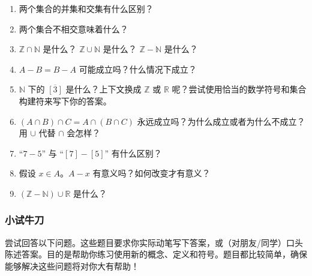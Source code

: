 \begin{enumerate}[label=(\arabic*)]
    \item 两个集合的并集和交集有什么区别？
    \item 两个集合不相交意味着什么？
    \item $\mathbb{Z} \cap \mathbb{N}$ 是什么？ $\mathbb{Z} \cup \mathbb{N}$ 是什么？ $\mathbb{Z}-\mathbb{N}$ 是什么？
    \item $A - B = B - A$ 可能成立吗？什么情况下成立？
    \item $\mathbb{N}$ 下的 $\overline{[3]}$ 是什么？上下文换成 $\mathbb{Z}$ 或 $\mathbb{R}$ 呢？尝试使用恰当的数学符号和集合构建符来写下你的答案。
    \item $(A \cap B) \cap C = A \cap (B \cap C)$ 永远成立吗？为什么成立或者为什么不成立？ 用 $\cup$ 代替 $\cap$ 会怎样？
    \item ``$7-5$'' 与 ``$[7]-[5]$'' 有什么区别？
    \item 假设 $x \in A$。$A - x$ 有意义吗？如何改变才有意义？
    \item $(\mathbb{Z} - \mathbb{N}) \cup \mathbb{R}$ 是什么？
\end{enumerate}

\subsubsection*{小试牛刀}

尝试回答以下问题。这些题目要求你实际动笔写下答案，或（对朋友/同学）口头陈述答案。目的是帮助你练习使用新的概念、定义和符号。题目都比较简单，确保能够解决这些问题将对你大有帮助！

